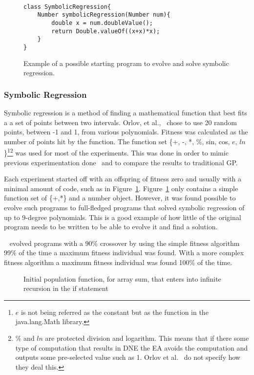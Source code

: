 \documentclass{sig-alternate}
\begin{document}
\begin{figure}
\centering
{\tt
\begin{verbatim}
class SymbolicRegression{
    Number symbolicRegression(Number num){
        double x = num.doubleValue();
        return Double.valueOf((x+x)*x);
    }
}
\end{verbatim}
}
\caption{Example of a possible starting program to evolve and solve symbolic regression.}
\label{regression}
\end{figure}
\subsubsection{Symbolic Regression}
Symbolic regression is a method of finding a mathematical function that best fits a a set of points between two intervals. Orlov, et al.,~\cite{FINCH:2011} chose to use 20 random points, between -1 and 1, from various polynomials. Fitness was calculated as the number of points hit by the function. The function set \{+, -, *, \%, sin, cos, $e$, $ln$\}\footnote{$e$ is not being referred as the constant but as the function in the java.lang.Math library.}\footnote{\% and $ln$ are protected division and logarithm. This means that if there some type of computation that results in DNE the EA avoids the computation and outputs some pre-selected value such as 1. Orlov et al.~\cite{FINCH:2011} do not specify how they deal this.} was used for most of the experiments. This was done in order to mimic previous experimentation done~\cite{koza:1992} and to compare the results to traditional GP.

Each experiment started off with an offspring of fitness zero and usually with a minimal amount of code, such as in Figure~\ref{regression}. Figure~\ref{regression} only contains a simple function set of \{+,*\} and a number object. However, it was found possible  to evolve such programs to full-fledged programs that solved symbolic regression of up to 9-degree polynomials. This is a good example of how little of the original program needs to be written to be able to evolve it and find a solution.

~\cite{FINCH:2011} evolved programs with a 90\% crossover by using the simple fitness algorithm 99\% of the time a maximum fitness individual was found. With a more complex fitness algorithm a maximum fitness individual was found 100\% of the time.


\begin{figure}
\centering
{}
\caption{Initial population function, for array sum, that enters into infinite recursion in the if statement}
\label{initial rec}
\end{figure}
\end{document}
